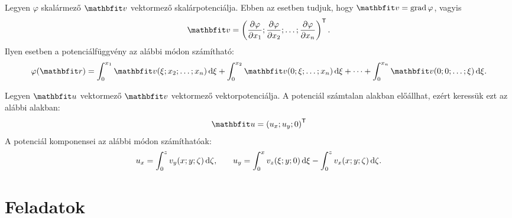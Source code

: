 \documentclass[lang=magyar]{math-handout}
\begin{document}
\begin{note}
  Legyen $\varphi$ skalármező $\rvec v$ vektormező skalárpotenciálja. Ebben
  az esetben tudjuk, hogy $\rvec v = \grad \varphi$, vagyis
  \[
    \rvec v = \left(
    \pdv{\varphi}{x_1};
    \pdv{\varphi}{x_2};
    \dots;
    \pdv{\varphi}{x_n}
    \right)^\transpose
    \text.
  \]
  Ilyen esetben a potenciálfüggvény az alábbi módon számítható:
  \[
    \varphi (\rvec r)
    = \int_0^{x_1} \rvec v(\xi; x_2; \dots; x_n) \,\diff \xi
    + \int_0^{x_2} \rvec v(0; \xi; \dots; x_n) \,\diff \xi
    + \dots
    + \int_0^{x_n} \rvec v(0; 0; \dots; \xi) \,\diff \xi
    \text.
  \]

  Legyen $\rvec u$ vektormező $\rvec v$ vektormező vektorpotenciálja.
  A potenciál számtalan alakban előállhat, ezért keressük ezt az alábbi alakban:
  \[
    \rvec u = \left( u_x; u_y; 0 \right)^\transpose
  \]
  A potenciál komponensei az alábbi módon számíthatóak:
  \[
    u_x = \int_0^z v_y(x; y; \zeta) \,\mathrm{d} \zeta
    \text,
    \qquad
    u_y = \int_0^x v_z(\xi; y; 0) \,\mathrm{d} \xi
    - \int_0^z v_x(x; y; \zeta) \,\mathrm{d} \zeta
    \text.
  \]
\end{note}

\clearpage
\section{Feladatok}

\end{document}

